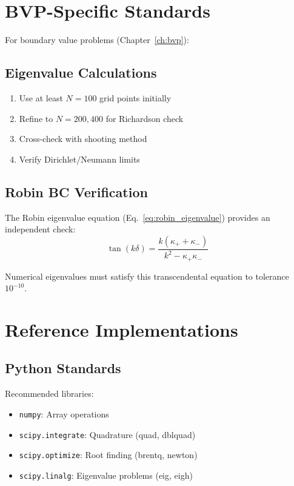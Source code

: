 \section{BVP-Specific Standards}

For boundary value problems (Chapter~\ref{ch:bvp}):

\subsection{Eigenvalue Calculations}

\begin{enumerate}
\item Use at least $N = 100$ grid points initially
\item Refine to $N = 200, 400$ for Richardson check
\item Cross-check with shooting method
\item Verify Dirichlet/Neumann limits
\end{enumerate}

\subsection{Robin BC Verification}

The Robin eigenvalue equation (Eq.~\ref{eq:robin_eigenvalue}) provides
an independent check:
\begin{equation}
\tan(k\delta) = \frac{k(\kappa_+ + \kappa_-)}{k^2 - \kappa_+\kappa_-}
\end{equation}

Numerical eigenvalues must satisfy this transcendental equation to
tolerance $10^{-10}$.

\section{Reference Implementations}

\subsection{Python Standards}

Recommended libraries:
\begin{itemize}[nosep]
\item \texttt{numpy}: Array operations
\item \texttt{scipy.integrate}: Quadrature (quad, dblquad)
\item \texttt{scipy.optimize}: Root finding (brentq, newton)
\item \texttt{scipy.linalg}: Eigenvalue problems (eig, eigh)
\end{itemize}

